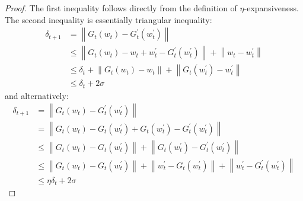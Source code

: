 \documentclass{article}[12pt]
\begin{document}
\begin{proof}
The first inequality follows directly from the definition of $\eta$-expansiveness. The second inequality is essentially triangular inequality:
\[
\begin{aligned}
   \delta_{t+1} &= \left\|G_t\left(w_{t}\right)-G_t^{\prime}\left(w_{t}^{\prime}\right)\right\| \\ 
&\leq\left\|G_t\left(w_{t}\right)-w_{t}+w_{t}^{\prime}-G_t^{\prime}\left(w_{t}^{\prime}\right)\right\|+\left\|w_{t}-w_{t}^{\prime}\right\| \\ 
&\leq \delta_{t}+\left\|G_t\left(w_{t}\right)-w_{t}\right\|+\left\|G_t\left(w_{t}^{\prime}\right)-w_{t}^{\prime}\right\| \\ 
&\leq \delta_{t}+2 \sigma
\end{aligned} 
\]
and alternatively:
\[
\begin{aligned} \delta_{t+1} &=\left\|G_{t}\left(w_{t}\right)-G_{t}^{\prime}\left(w_{t}^{\prime}\right)\right\| \\ &=\left\|G_{t}\left(w_{t}\right)-G_{t}\left(w_{t}^{\prime}\right)+G_{t}\left(w_{t}^{\prime}\right)-G_{t}^{\prime}\left(w_{t}^{\prime}\right)\right\| \\ & \leq\left\|G_{t}\left(w_{t}\right)-G_{t}\left(w_{t}^{\prime}\right)\right\|+\left\|G_{t}\left(w_{t}^{\prime}\right)-G_{t}^{\prime}\left(w_{t}^{\prime}\right)\right\| \\ & \leq\left\|G_{t}\left(w_{t}\right)-G_{t}\left(w_{t}^{\prime}\right)\right\|+\left\|w_{t}^{\prime}-G_{t}\left(w_{t}^{\prime}\right)\right\|+\left\|w_{t}^{\prime}-G_{t}^{\prime}\left(w_{t}^{\prime}\right)\right\| \\ & \leq \eta \delta_{t}+2 \sigma \end{aligned}
\]
\end{proof}
\end{document}
